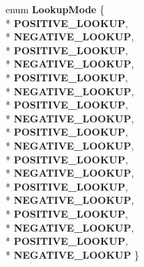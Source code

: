 \begin{DoxyCompactItemize}
\item 
enum {\bfseries Lookup\+Mode} \{ \\*
{\bfseries P\+O\+S\+I\+T\+I\+V\+E\+\_\+\+L\+O\+O\+K\+UP}, 
\\*
{\bfseries N\+E\+G\+A\+T\+I\+V\+E\+\_\+\+L\+O\+O\+K\+UP}, 
\\*
{\bfseries P\+O\+S\+I\+T\+I\+V\+E\+\_\+\+L\+O\+O\+K\+UP}, 
\\*
{\bfseries N\+E\+G\+A\+T\+I\+V\+E\+\_\+\+L\+O\+O\+K\+UP}, 
\\*
{\bfseries P\+O\+S\+I\+T\+I\+V\+E\+\_\+\+L\+O\+O\+K\+UP}, 
\\*
{\bfseries N\+E\+G\+A\+T\+I\+V\+E\+\_\+\+L\+O\+O\+K\+UP}, 
\\*
{\bfseries P\+O\+S\+I\+T\+I\+V\+E\+\_\+\+L\+O\+O\+K\+UP}, 
\\*
{\bfseries N\+E\+G\+A\+T\+I\+V\+E\+\_\+\+L\+O\+O\+K\+UP}, 
\\*
{\bfseries P\+O\+S\+I\+T\+I\+V\+E\+\_\+\+L\+O\+O\+K\+UP}, 
\\*
{\bfseries N\+E\+G\+A\+T\+I\+V\+E\+\_\+\+L\+O\+O\+K\+UP}, 
\\*
{\bfseries P\+O\+S\+I\+T\+I\+V\+E\+\_\+\+L\+O\+O\+K\+UP}, 
\\*
{\bfseries N\+E\+G\+A\+T\+I\+V\+E\+\_\+\+L\+O\+O\+K\+UP}, 
\\*
{\bfseries P\+O\+S\+I\+T\+I\+V\+E\+\_\+\+L\+O\+O\+K\+UP}, 
\\*
{\bfseries N\+E\+G\+A\+T\+I\+V\+E\+\_\+\+L\+O\+O\+K\+UP}, 
\\*
{\bfseries P\+O\+S\+I\+T\+I\+V\+E\+\_\+\+L\+O\+O\+K\+UP}, 
\\*
{\bfseries N\+E\+G\+A\+T\+I\+V\+E\+\_\+\+L\+O\+O\+K\+UP}, 
\\*
{\bfseries P\+O\+S\+I\+T\+I\+V\+E\+\_\+\+L\+O\+O\+K\+UP}, 
\\*
{\bfseries N\+E\+G\+A\+T\+I\+V\+E\+\_\+\+L\+O\+O\+K\+UP}
 \}\hypertarget{classv8_1_1internal_1_1_name_dictionary_lookup_stub_a374c659f56a0459475626d635b65be55}{}\label{classv8_1_1internal_1_1_name_dictionary_lookup_stub_a374c659f56a0459475626d635b65be55}


\end{DoxyCompactItemize}
